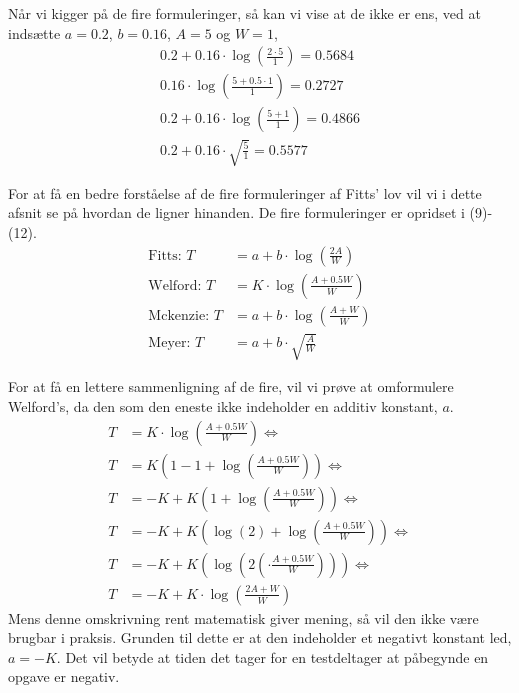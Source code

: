 Når vi kigger på de fire formuleringer, så kan vi vise at de ikke er ens, ved at indsætte $a=0.2$, $b=0.16$, $A = 5$ og $W = 1$,
\begin{align*}
0.2 + 0.16\cdot\log\left(\frac{2\cdot5}{1}\right) = 0.5684\\
0.16\cdot\log\left(\frac{5+0.5\cdot1}{1}\right) = 0.2727\\
0.2 + 0.16\cdot\log\left(\frac{5 + 1}{1}\right) = 0.4866\\
0.2 + 0.16\cdot\sqrt{\frac{5}{1}} = 0.5577
\end{align*}











For at få en bedre forståelse af de fire formuleringer af Fitts' lov vil vi i dette afsnit se på hvordan de ligner hinanden. De fire formuleringer er opridset i (9)-(12). 
\begin{align}
\text{Fitts: } T &= a+b\cdot\log\left(\frac{2A}{W}\right)\\
\text{Welford: } T &= K\cdot\log\left(\frac{A+0.5W}{W}\right)\\
\text{Mckenzie: } T &= a+b\cdot\log\left(\frac{A+W}{W}\right)\\
\text{Meyer: } T &= a+b\cdot\sqrt{\frac{A}{W}}
\end{align}

For at få en lettere sammenligning af de fire, vil vi prøve at omformulere Welford's, da den som den eneste ikke indeholder en additiv konstant, $a$. 
\begin{align*}
T &= K\cdot\log\left(\frac{A+0.5W}{W}\right)\Leftrightarrow\\
T &= K\left(1-1+\log\left(\frac{A+0.5W}{W}\right)\right)\Leftrightarrow\\
T &= -K+K\left(1+\log\left(\frac{A+0.5W}{W}\right)\right)\Leftrightarrow\\
T &= -K+K\left(\log(2)+\log\left(\frac{A+0.5W}{W}\right)\right)\Leftrightarrow\\
T &= -K+K\left(\log\left(2\left(\cdot\frac{A+0.5W}{W}\right)\right)\right)\Leftrightarrow\\
T &= -K+K\cdot\log\left(\frac{2A+W}{W}\right)
\end{align*}
Mens denne omskrivning rent matematisk giver mening, så vil den ikke være brugbar i praksis. Grunden til dette er at den indeholder et negativt konstant led, $a=-K$. Det vil betyde at tiden det tager for en testdeltager at påbegynde en opgave er negativ. 



